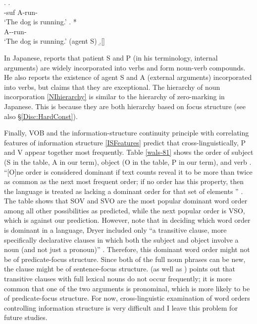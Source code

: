 	\ex. \ag.   \\
			-{\sc suf} {\sc A}-run- \\
			`The dog is running.'
		\bg. * \\
			{\sc A}--run- \\
			`The dog is running.'
			\hfill{(agent S)}
		\b.[] \hfill{\cite{allenetal84,baker88}}

In Japanese,
 reports that
patient S and P (in his terminology, internal arguments) are widely incorporated into verbs and form noun-verb compounds.
He also reports the existence of agent S and A (external arguments) incorporated into verbs,
but claims that they are exceptional.
The hierarchy of noun incorporation \ref{NIhierarchy} is similar to the hierarchy of zero-marking in Japanese.
This is because
they are both hierarchy based on focus structure (see also \S \ref{Disc:HardConst}).

Finally, VOB and the information-structure continuity principle with correlating features of information structure \ref{ISFeatures} predict that
cross-linguistically,
P and V appear together most frequently.
Table \ref{wals-81} shows the order of subject (S in the table, A in our term), object (O in the table, P in our term), and verb \cite{wals-81}.
``[O]ne order is considered dominant if text counts reveal it to be more than twice as common as the next most frequent order; if no order has this property, then the language is treated as lacking a dominant order for that set of elements '' \cite{wals-s6}.
The table shows that
SOV and SVO are the most popular dominant word order among all other possibilities as predicted,
while the next popular order is VSO,
which is against our prediction.
However, note that in deciding which word order is dominant in a language,
Dryer included only
``a transitive clause, more specifically declarative clauses in which both the subject and object involve a noun (and not just a pronoun)'' \cite{wals-81}.
Therefore, this dominant word order might not be of predicate-focus structure.
Since both of the full noun phrases can be new,
the clause might be of sentence-focus structure.
 (as well as ) points out that
transitive clauses with full lexical nouns do not occur frequently;
it is more common that
one of the two arguments is pronominal,
which is more likely to be of predicate-focus structure.
For now,
cross-linguistic examination of word orders controlling information structure is very difficult
and I leave this problem for future studies.

